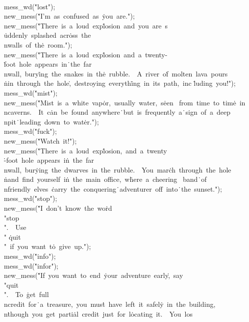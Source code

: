 \\{mess\_wd}(\.{"lost"});\6
\\{new\_mess}(\.{"I'm\ as\ confused\ as\ }\)\.{you\ are."});\6
\\{new\_mess}(\.{"There\ is\ a\ loud\ exp}\)\.{losion\ and\ you\ are\ s}\)%
\.{uddenly\ splashed\ acr}\)\.{oss\ the\\nwalls\ of\ th}\)\.{e\ room."});\6
\\{new\_mess}(\.{"There\ is\ a\ loud\ exp}\)\.{losion\ and\ a\ twenty-}\)%
\.{foot\ hole\ appears\ in}\)\.{\ the\ far\\nwall,\ bury}\)\.{ing\ the\ snakes\
in\ th}\)\.{e\ rubble.\ \ A\ river\ o}\)\.{f\ molten\ lava\ pours\\}\)\.{nin\
through\ the\ hole}\)\.{,\ destroying\ everyth}\)\.{ing\ in\ its\ path,\ inc}\)%
\.{luding\ you!"});\6
\\{mess\_wd}(\.{"mist"});\6
\\{new\_mess}(\.{"Mist\ is\ a\ white\ vap}\)\.{or,\ usually\ water,\ s}\)\.{een%
\ from\ time\ to\ tim}\)\.{e\ in\\ncaverns.\ \ It\ c}\)\.{an\ be\ found\
anywhere}\)\.{\ but\ is\ frequently\ a}\)\.{\ sign\ of\ a\ deep\\npit}\)\.{\
leading\ down\ to\ wat}\)\.{er."});\6
\\{mess\_wd}(\.{"fuck"});\6
\\{new\_mess}(\.{"Watch\ it!"});\6
\\{new\_mess}(\.{"There\ is\ a\ loud\ exp}\)\.{losion,\ and\ a\ twenty}\)%
\.{-foot\ hole\ appears\ i}\)\.{n\ the\ far\\nwall,\ bur}\)\.{ying\ the\
dwarves\ in\ }\)\.{the\ rubble.\ \ You\ mar}\)\.{ch\ through\ the\ hole\\}\)%
\.{nand\ find\ yourself\ i}\)\.{n\ the\ main\ office,\ w}\)\.{here\ a\ cheering%
\ band}\)\.{\ of\\nfriendly\ elves\ }\)\.{carry\ the\ conquering}\)\.{\
adventurer\ off\ into}\)\.{\ the\ sunset."});\6
\\{mess\_wd}(\.{"stop"});\6
\\{new\_mess}(\.{"I\ don't\ know\ the\ wo}\)\.{rd\ \\"stop\\".\ \ Use\ \\"}\)%
\.{quit\\"\ if\ you\ want\ t}\)\.{o\ give\ up."});\6
\\{mess\_wd}(\.{"info"});\5
\\{mess\_wd}(\.{"infor"});\6
\\{new\_mess}(\.{"If\ you\ want\ to\ end\ }\)\.{your\ adventure\ early}\)\.{,\
say\ \\"quit\\".\ \ To\ }\)\.{get\ full\\ncredit\ for}\)\.{\ a\ treasure,\ you\
mus}\)\.{t\ have\ left\ it\ safel}\)\.{y\ in\ the\ building,\\n}\)\.{though\
you\ get\ parti}\)\.{al\ credit\ just\ for\ l}\)\.{ocating\ it.\ \ You\ los}\)%
